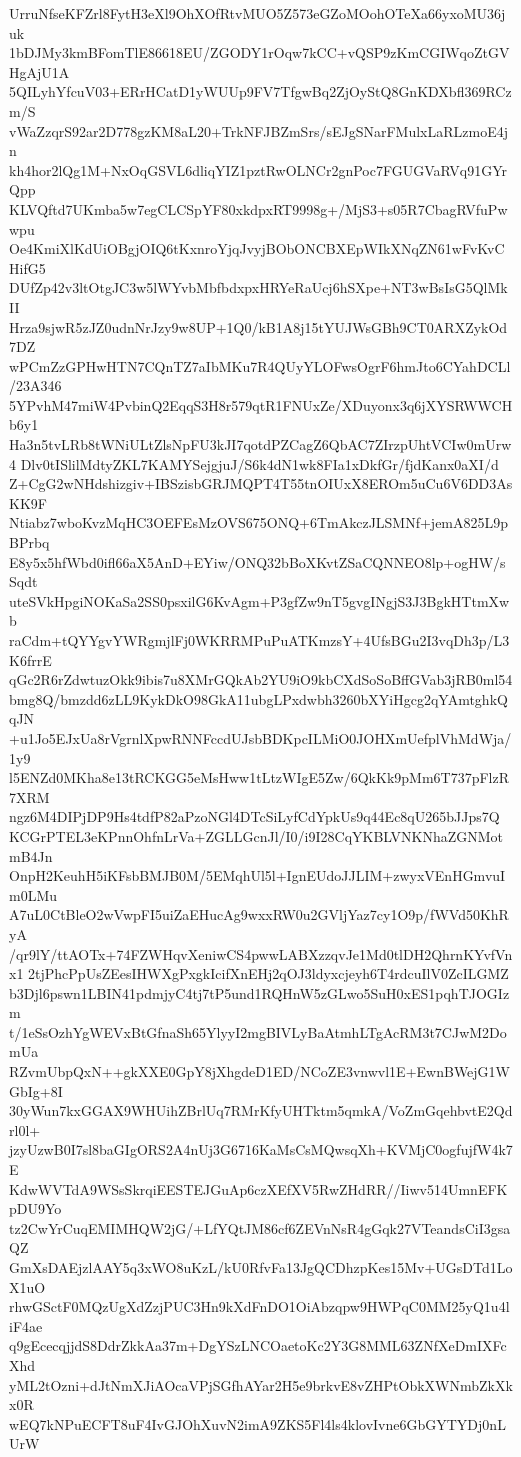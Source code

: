 UrruNfseKFZrl8FytH3eXl9OhXOfRtvMUO5Z573eGZoMOohOTeXa66yxoMU36juk
1bDJMy3kmBFomTlE86618EU/ZGODY1rOqw7kCC+vQSP9zKmCGIWqoZtGVHgAjU1A
5QILyhYfcuV03+ERrHCatD1yWUUp9FV7TfgwBq2ZjOyStQ8GnKDXbfl369RCzm/S
vWaZzqrS92ar2D778gzKM8aL20+TrkNFJBZmSrs/sEJgSNarFMulxLaRLzmoE4jn
kh4hor2lQg1M+NxOqGSVL6dliqYIZ1pztRwOLNCr2gnPoc7FGUGVaRVq91GYrQpp
KLVQftd7UKmba5w7egCLCSpYF80xkdpxRT9998g+/MjS3+s05R7CbagRVfuPwwpu
Oe4KmiXlKdUiOBgjOIQ6tKxnroYjqJvyjBObONCBXEpWIkXNqZN61wFvKvCHifG5
DUfZp42v3ltOtgJC3w5lWYvbMbfbdxpxHRYeRaUcj6hSXpe+NT3wBsIsG5QlMkII
Hrza9sjwR5zJZ0udnNrJzy9w8UP+1Q0/kB1A8j15tYUJWsGBh9CT0ARXZykOd7DZ
wPCmZzGPHwHTN7CQnTZ7aIbMKu7R4QUyYLOFwsOgrF6hmJto6CYahDCLl/23A346
5YPvhM47miW4PvbinQ2EqqS3H8r579qtR1FNUxZe/XDuyonx3q6jXYSRWWCHb6y1
Ha3n5tvLRb8tWNiULtZlsNpFU3kJI7qotdPZCagZ6QbAC7ZIrzpUhtVCIw0mUrw4
Dlv0tISlilMdtyZKL7KAMYSejgjuJ/S6k4dN1wk8FIa1xDkfGr/fjdKanx0aXI/d
Z+CgG2wNHdshizgiv+IBSzisbGRJMQPT4T55tnOIUxX8EROm5uCu6V6DD3AsKK9F
Ntiabz7wboKvzMqHC3OEFEsMzOVS675ONQ+6TmAkczJLSMNf+jemA825L9pBPrbq
E8y5x5hfWbd0ifl66aX5AnD+EYiw/ONQ32bBoXKvtZSaCQNNEO8lp+ogHW/sSqdt
uteSVkHpgiNOKaSa2SS0psxilG6KvAgm+P3gfZw9nT5gvgINgjS3J3BgkHTtmXwb
raCdm+tQYYgvYWRgmjlFj0WKRRMPuPuATKmzsY+4UfsBGu2I3vqDh3p/L3K6frrE
qGc2R6rZdwtuzOkk9ibis7u8XMrGQkAb2YU9iO9kbCXdSoSoBffGVab3jRB0ml54
bmg8Q/bmzdd6zLL9KykDkO98GkA11ubgLPxdwbh3260bXYiHgcg2qYAmtghkQqJN
+u1Jo5EJxUa8rVgrnlXpwRNNFccdUJsbBDKpcILMiO0JOHXmUefplVhMdWja/1y9
l5ENZd0MKha8e13tRCKGG5eMsHww1tLtzWIgE5Zw/6QkKk9pMm6T737pFlzR7XRM
ngz6M4DIPjDP9Hs4tdfP82aPzoNGl4DTcSiLyfCdYpkUs9q44Ec8qU265bJJps7Q
KCGrPTEL3eKPnnOhfnLrVa+ZGLLGcnJl/I0/i9I28CqYKBLVNKNhaZGNMotmB4Jn
OnpH2KeuhH5iKFsbBMJB0M/5EMqhUl5l+IgnEUdoJJLIM+zwyxVEnHGmvuIm0LMu
A7uL0CtBleO2wVwpFI5uiZaEHucAg9wxxRW0u2GVljYaz7cy1O9p/fWVd50KhRyA
/qr9lY/ttAOTx+74FZWHqvXeniwCS4pwwLABXzzqvJe1Md0tlDH2QhrnKYvfVnx1
2tjPhcPpUsZEesIHWXgPxgkIcifXnEHj2qOJ3ldyxcjeyh6T4rdcuIlV0ZcILGMZ
b3Djl6pswn1LBIN41pdmjyC4tj7tP5und1RQHnW5zGLwo5SuH0xES1pqhTJOGIzm
t/1eSsOzhYgWEVxBtGfnaSh65YlyyI2mgBIVLyBaAtmhLTgAcRM3t7CJwM2DomUa
RZvmUbpQxN++gkXXE0GpY8jXhgdeD1ED/NCoZE3vnwvl1E+EwnBWejG1WGbIg+8I
30yWun7kxGGAX9WHUihZBrlUq7RMrKfyUHTktm5qmkA/VoZmGqehbvtE2Qdrl0l+
jzyUzwB0I7sl8baGIgORS2A4nUj3G6716KaMsCsMQwsqXh+KVMjC0ogfujfW4k7E
KdwWVTdA9WSsSkrqiEESTEJGuAp6czXEfXV5RwZHdRR//Iiwv514UmnEFKpDU9Yo
tz2CwYrCuqEMIMHQW2jG/+LfYQtJM86cf6ZEVnNsR4gGqk27VTeandsCiI3gsaQZ
GmXsDAEjzlAAY5q3xWO8uKzL/kU0RfvFa13JgQCDhzpKes15Mv+UGsDTd1LoX1uO
rhwGSctF0MQzUgXdZzjPUC3Hn9kXdFnDO1OiAbzqpw9HWPqC0MM25yQ1u4liF4ae
q9gEcecqjjdS8DdrZkkAa37m+DgYSzLNCOaetoKc2Y3G8MML63ZNfXeDmIXFcXhd
yML2tOzni+dJtNmXJiAOcaVPjSGfhAYar2H5e9brkvE8vZHPtObkXWNmbZkXkx0R
wEQ7kNPuECFT8uF4IvGJOhXuvN2imA9ZKS5Fl4ls4klovIvne6GbGYTYDj0nLUrW
